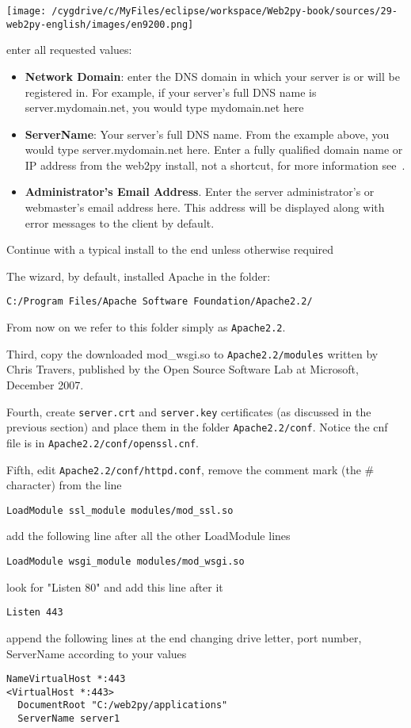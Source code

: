 \documentclass[justified,sixbynine,notoc]{tufte-book}
\def\ft{\small\tt}
\begin{document}
\begin{fullwidth}
\goodbreak\begin{center}\texttt{[image: /cygdrive/c/MyFiles/eclipse/workspace/Web2py-book/sources/29-web2py-english/images/en9200.png]}\end{center}

\noindent enter all requested values:
\begin{itemize}
\item {\bf Network Domain}: enter the DNS domain in which your server is or will be registered in.  For example, if your server's full DNS name is server.mydomain.net, you would type mydomain.net here

\item {\bf ServerName}: Your server's full DNS name. From the example above, you would type server.mydomain.net here. Enter a fully qualified domain name or IP address from the web2py install, not a shortcut, for more information see~\cite{apache2}.

\item {\bf Administrator's Email Address}. Enter the server administrator's or webmaster's email address here. This address will be displayed along with error messages to the client by default.
\end{itemize}

Continue with a typical install to the end unless otherwise required

The wizard, by default, installed Apache in the folder:
\begin{lstlisting}
C:/Program Files/Apache Software Foundation/Apache2.2/
\end{lstlisting}

From now on we refer to this folder simply as {\ft Apache2.2}.

Third, copy the downloaded mod\_wsgi.so to
{\ft Apache2.2/modules}
\noindent written by Chris Travers, published by the Open Source Software Lab at Microsoft, December 2007.

Fourth, create {\ft server.crt} and {\ft server.key} certificates (as discussed in the previous section) and place them in the folder  {\ft Apache2.2/conf}. Notice the cnf file is in {\ft Apache2.2/conf/openssl.cnf}.

Fifth, edit {\ft Apache2.2/conf/httpd.conf},
remove the comment mark (the \# character) from the line
\begin{lstlisting}
LoadModule ssl_module modules/mod_ssl.so
\end{lstlisting}
\noindent add the following line after all the other LoadModule lines
\begin{lstlisting}
LoadModule wsgi_module modules/mod_wsgi.so
\end{lstlisting}
\noindent look for "Listen 80" and add this line after it
\begin{lstlisting}
Listen 443
\end{lstlisting}
\noindent append the following lines at the end changing  drive letter, port number,
ServerName according to your values
\begin{lstlisting}
NameVirtualHost *:443
<VirtualHost *:443>
  DocumentRoot "C:/web2py/applications"
  ServerName server1


\end{lstlisting}
\end{fullwidth}
\end{document}
